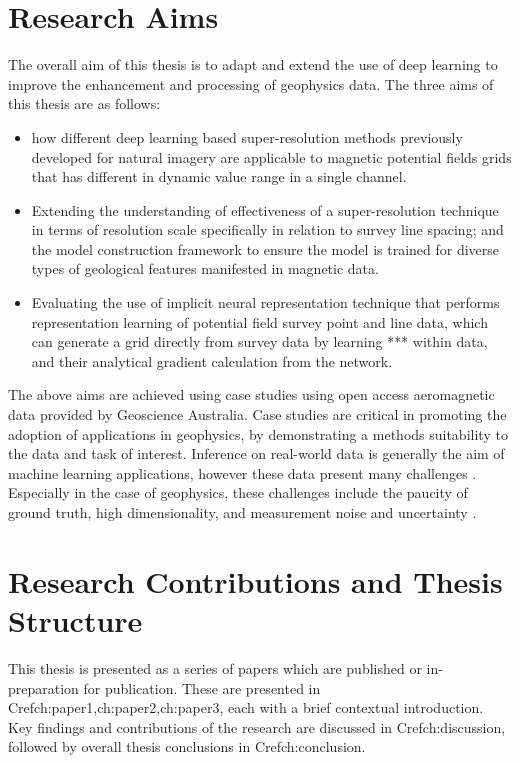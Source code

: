 \documentclass[manuscript.tex]{subfiles}
\begin{document}
\section{Research Aims}
The overall aim of this thesis is to adapt and extend the use of deep learning to improve the enhancement and processing of geophysics data. The three aims of this thesis are as follows:

\begin{itemize}
    \item{} how different deep learning based super-resolution methods previously developed for natural imagery are applicable to magnetic potential fields grids that has different in dynamic value range in a single channel.

    \item{}Extending the understanding of effectiveness of a super-resolution technique in terms of resolution scale specifically in relation to survey line spacing; and the model construction framework to ensure the model is trained for diverse types of geological features manifested in magnetic data.

    \item{}Evaluating the use of implicit neural representation technique that performs representation learning of potential field survey point and line data, which can generate a grid directly from survey data by learning *** within data, and their analytical gradient calculation from the network.
\end{itemize}

The above aims are achieved using case studies using open access aeromagnetic data provided by Geoscience Australia.
Case studies are critical in promoting the adoption of applications in geophysics, by demonstrating a methods suitability to the data and task of interest.
Inference on real-world data is generally the aim of machine learning applications, however these data present many challenges \parencite{nikolenkoSyntheticDataDeep2021,tremblayTrainingDeepNetworks2018}.
Especially in the case of geophysics, these challenges include the paucity of ground truth, high dimensionality, and measurement noise and uncertainty \parencite{karpatneMachineLearningGeosciences2019}.


\section{Research Contributions and Thesis Structure}
This thesis is presented as a series of papers which are published or in-preparation for publication.
These are presented in Cref{ch:paper1,ch:paper2,ch:paper3}, each with a brief contextual introduction.
Key findings and contributions of the research are discussed in Cref{ch:discussion}, followed by overall thesis conclusions in Cref{ch:conclusion}.
\end{document}
